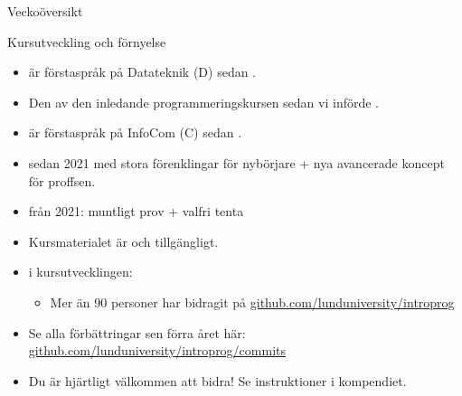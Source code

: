 \ifkompendium\else

\begin{SlideExtra}{Veckoöversikt}
  \noindent\resizebox{0.9\columnwidth}{!}{
  
  }
\end{SlideExtra}
  
\begin{SlideExtra}{Kursutveckling och förnyelse}\SlideFontSmall
\begin{itemize}
\item {} är förstaspråk på Datateknik (D) sedan .
\item[] Den  av den inledande programmeringskursen sedan vi införde .
\item {} är förstaspråk på InfoCom (C) sedan .
\item {} sedan 2021 med stora förenklingar för nybörjare + nya avancerade koncept för proffsen.
\item {} från 2021: muntligt prov + valfri tenta
\item Kursmaterialet är  och  tillgängligt.
\item {} i kursutvecklingen:
\begin{itemize}\SlideFontTiny
\item Mer än 90 personer har bidragit på \href{https://github.com/lunduniversity/introprog}{github.com/lunduniversity/introprog}
\end{itemize}
\item Se alla förbättringar sen förra året här: \href{https://github.com/lunduniversity/introprog/commits}{github.com/lunduniversity/introprog/commits}
\item Du är hjärtligt välkommen att bidra! Se instruktioner i kompendiet.
\end{itemize}
\end{SlideExtra}

